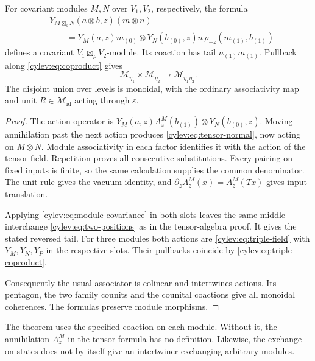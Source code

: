 \begin{theorem}\label{cylev:thm:modules}
For covariant modules $M,N$ over $V_1,V_2$, respectively, the formula
\begin{equation}\label{cylev:eq:module-tensor}
\begin{split}
 &Y_{M\boxtimes_\rho N}(a\otimes b,z)(m\otimes n)\\
 &\qquad=Y_M(a,z)m_{(0)}\otimes Y_N(b_{(0)},z)n\,
                         \rho_{-z}(m_{(1)},b_{(1)})
\end{split}
\end{equation}
defines a covariant $V_1\boxtimes_\rho V_2$-module.
Its coaction has tail $n_{(1)}m_{(1)}$.
Pullback along \eqref{cylev:eq:coproduct} gives
\[
 \mathcal M_{\eta_1}\times\mathcal M_{\eta_2}
       \longrightarrow\mathcal M_{\eta_1\eta_2}.
\]
The disjoint union over levels is monoidal, with the ordinary
associativity map and unit $R\in\mathcal M_{\mathrm{id}}$ acting
through $\varepsilon$.
\end{theorem}
\begin{proof}
The action operator is
$Y_M(a,z)A_z^M(b_{(1)})\otimes Y_N(b_{(0)},z)$.
Moving annihilation past the next action produces
\eqref{cylev:eq:tensor-normal}, now acting on $M\otimes N$.
Module associativity in each factor identifies it with the action
of the tensor field. Repetition proves all consecutive substitutions.
Every pairing on fixed inputs is finite, so the same calculation
supplies the common denominator.
The unit rule gives the vacuum identity, and
$\partial_zA_z^M(x)=A_z^M(Tx)$ gives input translation.

Applying \eqref{cylev:eq:module-covariance} in both slots leaves the
same middle interchange \eqref{cylev:eq:two-positions} as in the
tensor-algebra proof. It gives the stated reversed tail.
For three modules both actions are \eqref{cylev:eq:triple-field}
with $Y_M,Y_N,Y_P$ in the respective slots.
Their pullbacks coincide by \eqref{cylev:eq:triple-coproduct}.

Consequently the usual associator is colinear and intertwines actions.
Its pentagon, the two family counits and the counital coactions give
all monoidal coherences. The formulas preserve module morphisms.
\end{proof}

The theorem uses the specified coaction on each module.
Without it, the annihilation $A_z^M$ in the tensor formula has no
definition. Likewise, the exchange on states does not by itself give
an intertwiner exchanging arbitrary modules.

